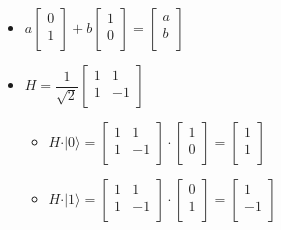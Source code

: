 \documentclass[12pt,a4paper]{report}
\begin{document}
\begin{itemize}
\item $a
\begin{bmatrix}
0 \\
1 \\
\end{bmatrix}
+
b
\begin{bmatrix}
1 \\
0 \\
\end{bmatrix}
=
\begin{bmatrix}
a \\
b \\
\end{bmatrix}
$

\item
$
H = \dfrac{1}{\sqrt{2}}
\begin{bmatrix}
1 & 1 \\
1 & -1 \\
\end{bmatrix}
$
\begin{itemize}
\item $ H \cdot \vert 0 \rangle =
\begin{bmatrix}
1 & 1 \\
1 & -1 \\
\end{bmatrix}
\cdot
\begin{bmatrix}
1 \\
0 \\
\end{bmatrix}
=
\begin{bmatrix}
1 \\
1 \\
\end{bmatrix}
$
\item $ H \cdot \vert 1 \rangle =
\begin{bmatrix}
1 & 1 \\
1 & -1 \\
\end{bmatrix}
\cdot
\begin{bmatrix}
0 \\
1 \\
\end{bmatrix}
=
\begin{bmatrix}
1 \\
-1 \\
\end{bmatrix}
$
\end{itemize}
\end{itemize}
\end{document}
